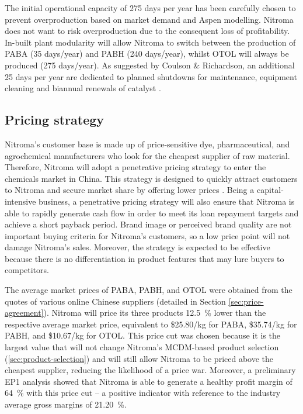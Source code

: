 The initial operational capacity of 275 days per year has been carefully chosen to prevent overproduction based on market demand and Aspen modelling. Nitroma does not want to risk overproduction due to the consequent loss of profitability. In-built plant modularity will allow Nitroma to switch between the production of PABA (35 days/year) and PABH (240 days/year), whilst OTOL will always be produced (275 days/year). As suggested by Coulson \& Richardson, an additional 25 days per year are dedicated to planned shutdowns for maintenance, equipment cleaning and biannual renewals of catalyst \cite{sinnott_coulson_2005}. 

\subsection{Pricing strategy}
\label{sec:pricing-strategy}
Nitroma’s customer base is made up of price-sensitive dye, pharmaceutical, and agrochemical manufacturers who look for the cheapest supplier of raw material. Therefore, Nitroma will adopt a penetrative pricing strategy to enter the chemicals market in China. This strategy is designed to quickly attract customers to Nitroma and secure market share by offering lower prices \cite{corporate_finance_institute_penetrative_2021}. Being a capital-intensive business, a penetrative pricing strategy will also ensure that Nitroma is able to rapidly generate cash flow in order to meet its loan repayment targets and achieve a short payback period. Brand image or perceived brand quality are not important buying criteria for Nitroma’s customers, so a low price point will not damage Nitroma’s sales. Moreover, the strategy is expected to be effective because there is no differentiation in product features that may lure buyers to competitors.

The average market prices of PABA, PABH, and OTOL were obtained from the quotes of various online Chinese suppliers (detailed in Section \ref{sec:price-agreement}).  Nitroma will price its three products \SI{12.5}{\percent} lower than the respective average market price, equivalent to \$25.80/kg for PABA, \$35.74/kg for PABH, and \$10.67/kg for OTOL. This price cut was chosen because it is the largest value that will not change Nitroma’s MCDM-based product selection (\cref{sec:product-selection}) and will still allow Nitroma to be priced above the cheapest supplier, reducing the likelihood of a price war. Moreover, a preliminary EP1 analysis showed that Nitroma is able to generate a healthy profit margin of \SI{64}{\percent} with this price cut – a positive indicator with reference to the industry average gross margins of \SI{21.20}{\percent}. 

